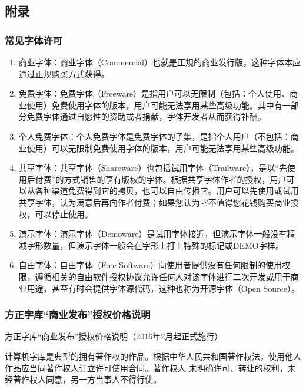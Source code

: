 \documentclass[11pt,a4paper,UTF8,titlepage]{ctexart} %
\begin{document}
    \subsection{附录}
    \subsubsection{常见字体许可}
    \begin{enumerate}
        \item 商业字体：商业字体（Commercial）也就是正规的商业发行版，这种字体本应通过正规购买方式获得。

        \item 免费字体：免费字体（Freeware）是指用户可以无限制（包括：个人使用、商业使用）免费使用字体的版本，用户可能无法享用某些高级功能。其中有一部分免费字体通过自愿性的资助或者捐献，字体开发者从而获得补酬。

        \item 个人免费字体：个人免费字体是免费字体的子集，是指个人用户（不包括：商业使用）可以无限制免费使用字体的版本，用户可能无法享用某些高级功能。

        \item 共享字体：共享字体（Shareware）也包括试用字体（Trailware），是以“先使用后付费”的方式销售的享有版权的字体。根据共享字体作者的授权，用户可以从各种渠道免费得到它的拷贝，也可以自由传播它。用户可以先使用或试用共享字体，认为满意后再向作者付费；如果您认为它不值得您花钱购买商业授权，可以停止使用。

        \item 演示字体：演示字体（Demoware）是试用字体接近，但演示字体一般没有精减字形数量，但演示字体一般会在字形上打上特殊的标记或DEMO字样。

        \item 自由字体：自由字体（Free Software）向使用者提供没有任何限制的使用权限，遵循相关的自由软件授权协议允许任何人对该字体进行二次开发或用于商业用途，甚至有时会提供字体源代码，这种也称为开源字体（Open Source）。

    \end{enumerate}

    \subsubsection{方正字库“商业发布”授权价格说明}
    方正字库“商业发布”授权价格说明（2016年2月起正式施行）

    计算机字库是典型的拥有著作权的作品。根据中华人民共和国著作权法，使用他人作品应当同著作权人订立许可使用合同。著作权人 未明确许可、转让的权利，未经著作权人同意，另一方当事人不得行使。
\end{document}
